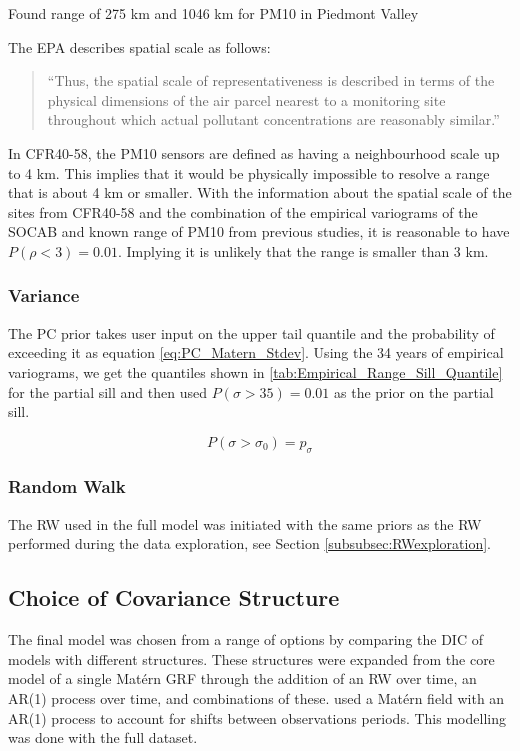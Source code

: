 \documentclass{article}
\begin{document}
\cite{cameletti2011spatio} Found range of 275 km and 1046 km for PM10 in Piedmont Valley

The \ac{EPA} describes spatial scale as follows:
\begin{quote}
	``Thus, the spatial scale of representativeness is described in terms of the physical dimensions of the air parcel nearest to a monitoring site throughout which actual pollutant concentrations are reasonably similar.''   \end{quote}
In CFR40-58, the \ac{PM10} sensors are defined as having a neighbourhood scale up to 4 km.  This implies that it would be physically impossible to resolve a range that is about 4 km or smaller.  With the information about the spatial scale of the sites from CFR40-58 and the combination of the empirical variograms of the \ac{SOCAB} and known range of \ac{PM10} from previous studies, it is reasonable to have $P(\rho < 3) = 0.01$. Implying it is unlikely that the range is smaller than 3 km.



\subsubsection*{Variance}
\label{subsubsec:variance}
The PC prior takes user input on the upper tail quantile and the probability of exceeding it as equation \ref{eq:PC_Matern_Stdev}.  Using the 34 years of empirical variograms, we get the quantiles shown in \ref{tab:Empirical_Range_Sill_Quantile} for the partial sill and then used $P(\sigma > 35) = 0.01$ as the prior on the partial sill.

\begin{equation}
	P(\sigma > \sigma_0) = p_{\sigma}    
\end{equation} \label{eq:PC_Matern_Stdev}

\subsubsection{Random Walk}
\label{subsubsec:ranwalk}
The \ac{RW} used in the full model was initiated with the same priors as the \ac{RW} performed during the data exploration, see Section \ref{subsubsec:RWexploration}.


\subsection{Choice of Covariance Structure}
\label{subsec:covstructchoice}
The final model was chosen from a range of options by comparing the DIC of models with different structures.  These structures were expanded from the core model of a single Mat\'{e}rn \ac{GRF} through the addition of an RW over time, an AR(1) process over time, and combinations of these.  \cite{cameletti2011spatio} used a Mat\'{e}rn field with an AR(1) process to account for shifts between observations periods.  This modelling was done with the full dataset.
\end{document}
